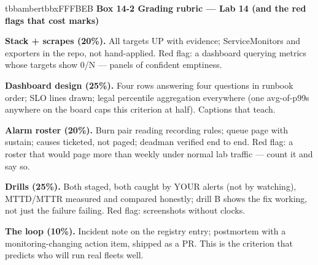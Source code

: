 \begin{calloutbox}{tbbamber}{tbbxFFFBEB}
{\normalsize\bfseries\color{tbbx92400E}Box 14-2  Grading rubric — Lab 14 (and the red flags that cost marks)}\par\vspace{3pt}
\begin{tbbitemize}
  \item \textbf{Stack + scrapes (20\%).} All targets UP with evidence; ServiceMonitors and exporters in the repo, not hand-applied. Red flag: a dashboard querying metrics whose targets show 0/N — panels of confident emptiness.
  \item \textbf{Dashboard design (25\%).} Four rows answering four questions in runbook order; SLO lines drawn; legal percentile aggregation everywhere (one avg-of-p99s anywhere on the board caps this criterion at half). Captions that teach.
  \item \textbf{Alarm roster (20\%).} Burn pair reading recording rules; queue page with sustain; causes ticketed, not paged; deadman verified end to end. Red flag: a roster that would page more than weekly under normal lab traffic — count it and say so.
  \item \textbf{Drills (25\%).} Both staged, both caught by YOUR alerts (not by watching), MTTD/MTTR measured and compared honestly; drill B shows the fix working, not just the failure failing. Red flag: screenshots without clocks.
  \item \textbf{The loop (10\%).} Incident note on the registry entry; postmortem with a monitoring-changing action item, shipped as a PR. This is the criterion that predicts who will run real fleets well.
\end{tbbitemize}
\end{calloutbox}

